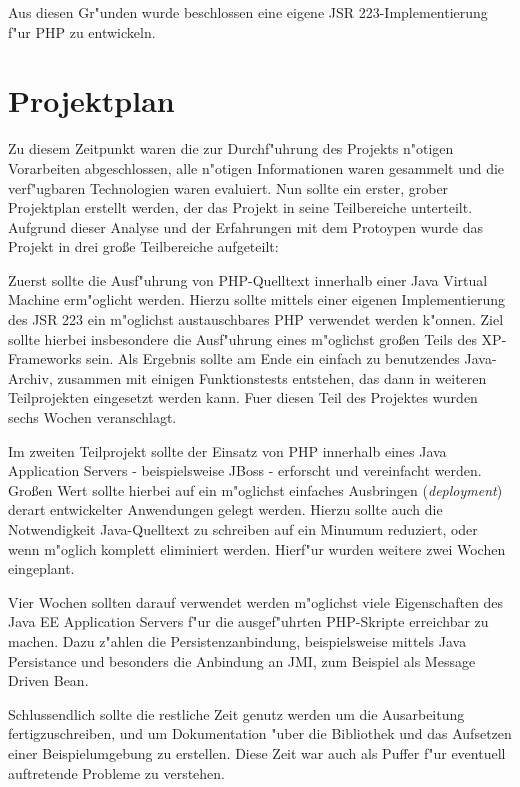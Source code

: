 Aus diesen Gr"unden wurde beschlossen eine eigene JSR 223-Implementierung f"ur PHP zu entwickeln.

\section{Projektplan}
\label{sec:javanscripts:project}

Zu diesem Zeitpunkt waren die zur Durchf"uhrung des Projekts n"otigen Vorarbeiten abgeschlossen, alle n"otigen Informationen waren
gesammelt und die verf"ugbaren Technologien waren evaluiert. Nun sollte ein erster, grober Projektplan erstellt werden, der das Projekt
in seine Teilbereiche unterteilt.
Aufgrund dieser Analyse und der Erfahrungen mit dem Protoypen wurde das Projekt in drei gro\ss e Teilbereiche aufgeteilt:

Zuerst sollte die Ausf"uhrung von PHP-Quelltext innerhalb einer Java Virtual Machine erm"oglicht werden. Hierzu sollte
mittels einer eigenen Implementierung des JSR 223 ein m"oglichst austauschbares PHP verwendet werden k"onnen. 
Ziel sollte hierbei insbesondere die Ausf"uhrung eines m"oglichst gro\ss en Teils des XP-Frameworks sein. Als Ergebnis sollte 
am Ende ein einfach zu benutzendes Java-Archiv, zusammen mit einigen Funktionstests entstehen, das dann in weiteren Teilprojekten 
eingesetzt werden kann. Fuer diesen Teil des Projektes wurden sechs Wochen veranschlagt.

Im zweiten Teilprojekt sollte der Einsatz von PHP innerhalb eines Java Application Servers - beispielsweise JBoss - erforscht
und vereinfacht werden. Gro\ss en Wert sollte hierbei auf ein m"oglichst einfaches Ausbringen (\emph{deployment}) derart 
entwickelter Anwendungen gelegt werden. Hierzu sollte auch die Notwendigkeit Java-Quelltext zu schreiben auf ein Minumum reduziert, 
oder wenn m"oglich komplett eliminiert werden. Hierf"ur wurden weitere zwei Wochen eingeplant.

Vier Wochen sollten darauf verwendet werden m"oglichst viele Eigenschaften des Java EE Application Servers
f"ur die ausgef"uhrten PHP-Skripte erreichbar zu machen. Dazu z"ahlen die Persistenzanbindung, beispielsweise mittels Java
Persistance und besonders die Anbindung an JMI, zum Beispiel als Message Driven Bean.

Schlussendlich sollte die restliche Zeit genutz werden um die Ausarbeitung fertigzuschreiben, und um Dokumentation "uber die
Bibliothek und das Aufsetzen einer Beispielumgebung zu erstellen. Diese Zeit war auch als Puffer f"ur eventuell auftretende
Probleme zu verstehen.

